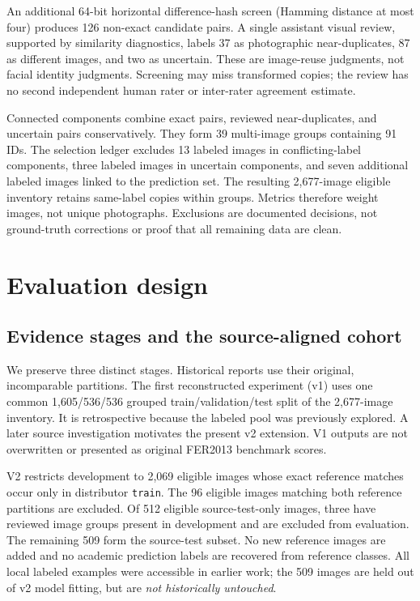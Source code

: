 \documentclass[11pt,a4paper]{article}
\begin{document}
An additional 64-bit horizontal difference-hash screen (Hamming distance at most
four) produces 126 non-exact candidate pairs. A single assistant visual review,
supported by similarity diagnostics, labels 37 as photographic near-duplicates,
87 as different images, and two as uncertain. These are image-reuse judgments,
not facial identity judgments. Screening may miss transformed copies; the review
has no second independent human rater or inter-rater agreement estimate.

Connected components combine exact pairs, reviewed near-duplicates, and uncertain
pairs conservatively. They form 39 multi-image groups containing 91 IDs. The
selection ledger excludes 13 labeled images in conflicting-label components,
three labeled images in uncertain components, and seven additional labeled
images linked to the prediction set. The resulting 2,677-image eligible inventory
retains same-label copies within groups. Metrics therefore weight images, not
unique photographs. Exclusions are documented decisions, not ground-truth
corrections or proof that all remaining data are clean.

\section{Evaluation design}
\subsection{Evidence stages and the source-aligned cohort}
We preserve three distinct stages. Historical reports use their original,
incomparable partitions. The first reconstructed experiment (v1) uses one common
1,605/536/536 grouped train/validation/test split of the 2,677-image inventory.
It is retrospective because the labeled pool was previously explored. A later
source investigation motivates the present v2 extension. V1 outputs are not
overwritten or presented as original FER2013 benchmark scores.

V2 restricts development to 2,069 eligible images whose exact reference matches
occur only in distributor \texttt{train}. The 96 eligible images matching both
reference partitions are excluded. Of 512 eligible source-test-only images,
three have reviewed image groups present in development and are excluded from
evaluation. The remaining 509 form the source-test subset. No new reference
images are added and no academic prediction labels are recovered from reference
classes. All local labeled examples were accessible in earlier work; the 509
images are held out of v2 model fitting, but are \emph{not historically untouched}.
\end{document}
